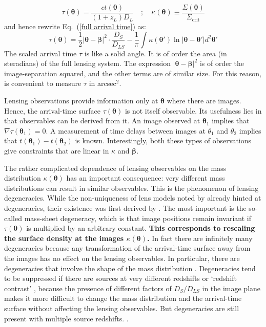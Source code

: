\documentclass[galley,usenatbib]{mn2e}
\renewcommand{\vec}[1]{\ensuremath{\boldsymbol{#1}}}
\newcommand{\hilight}[1]{{\bf \color{OliveGreen} #1}}
\newcommand{\eqnref}[1] {Eq.~(\ref{#1})}
\begin{document}
%
\begin{equation}
\tau(\vec\theta) = \frac{ct(\vec\theta)}{(1+z_L)D_{L}} \quad ; \quad 
\kappa(\vec\theta) \equiv \frac{\Sigma(\vec\theta)}{\Sigma_\mathrm{crit}}
\end{equation}
%
and hence rewrite \eqnref{full arrival time} as:
%
\begin{equation}
\tau(\vec\theta) = {\textstyle\frac12} |\vec\theta - \vec\beta|^2
                   \cdot \frac{D_{S}}{D_{LS}}
                 - \frac1\pi \int \kappa (\vec\theta')
                   \ln|\vec\theta - \vec\theta'| d^2\vec\theta'
\label{arrival time}
\end{equation}
%
The scaled arrival time $\tau$ is like a solid angle. It is of order the area
(in steradians) of the full lensing system. The expression $|\vec\theta -
\vec\beta|^2$ is of order the image-separation squared, and the other terms are
of similar size.  For this reason, is convenient to measure $\tau$ in
arcsec$^{2}$.

Lensing observations provide information only at $\vec\theta$ where there are
images.  Hence, the arrival-time surface $\tau(\vec\theta)$ is not itself
observable.  Its usefulness lies in that observables can be derived from it.
An image observed at $\vec\theta_1$ implies that $\nabla\tau(\vec\theta_1)=0$.
A measurement of time delays between images at $\theta_1$ and $\theta_2$
implies that $t(\vec\theta_1)-t(\vec\theta_2)$ is known.  Interestingly, both
these types of observations give constraints that are linear in $\kappa$ and
$\vec\beta$.

The rather complicated dependence of lensing observables on the mass
distribution $\kappa(\vec\theta)$ has an important consequence: very different
mass distributions can result in similar observables.  This is the phenomenon
of lensing degeneracies.  While the non-uniqueness of lens models noted by
\cite{1981ApJ...244..736Y} already hinted at degeneracies, their existence was
first derived by \cite{1985ApJ...289L...1F}.  The most important is the
so-called mass-sheet degeneracy, which is that image positions remain invariant
if $\tau(\vec\theta)$ is multiplied by an arbitrary constant.  
\hilight{This corresponds
to rescaling the surface density at the images $\kappa(\vec\theta)$.} In fact
there are infinitely many degeneracies \citep{2000AJ....120.1654S} because any
transformation of the arrival-time surface away from the images has no effect
on the lensing observables.  In particular, there are degeneracies that involve
the shape of the mass distribution
\citep{2006ApJ...653..936S,2013arXiv1306.4675S}.  Degeneracies tend to be
suppressed if there are sources at very different redshifts or `redshift
contrast' \citep{1998AJ....116.1541A,2009ApJ...690..154S}, because the presence
of different factors of $D_S/D_{LS}$ in the image plane makes it more difficult
to change the mass distribution and the arrival-time surface without affecting
the lensing observables.  But degeneracies are still present with multiple
source redshifts.  \citep{2008MNRAS.386..307L}.
\end{document}
